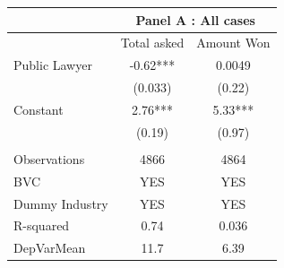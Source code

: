 \begin{tabular}{lcc}
\toprule
      & \multicolumn{2}{c}{Panel A : All cases} \\
\midrule
\midrule
      & Total asked & Amount Won  \\
\midrule
\midrule
Public Lawyer & -0.62*** & 0.0049  \\
      & (0.033) & (0.22)  \\
Constant & 2.76*** & 5.33***  \\
      & (0.19) & (0.97)  \\
      &       &        \\
\midrule
Observations & 4866  & 4864   \\
BVC   & YES   & YES    \\
Dummy Industry & YES   & YES   \\
R-squared & 0.74  & 0.036  \\
DepVarMean & 11.7  & 6.39   \\


\bottomrule
\bottomrule
\end{tabular}%
